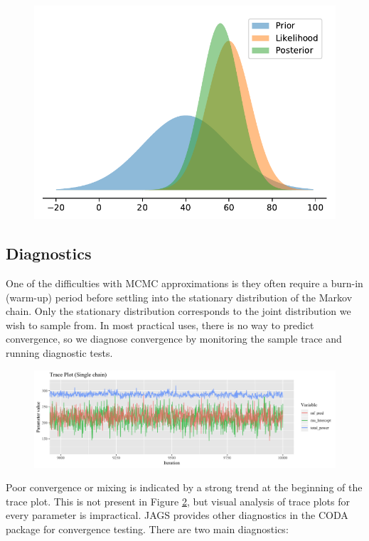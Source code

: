 \documentclass[a4paper, 12pt]{article}
\begin{document}
\begin{figure}
\centering
  \includegraphics[width=0.5\linewidth]{media/bayesdemo}
  \label{fig:bayesdemo}
\end{figure}

\subsection{Diagnostics}
One of the difficulties with MCMC approximations is they often require a burn-in (warm-up) period before settling into the stationary distribution of the Markov chain. Only the stationary distribution corresponds to the joint distribution we wish to sample from. In most practical uses, there is no way to predict convergence, so we diagnose convergence by monitoring the sample trace and running diagnostic tests.

\begin{figure}
\centering
  \includegraphics[width=\linewidth]{media/trace_plot}
  \label{fig:trace_plot}
\end{figure}

Poor convergence or mixing is indicated by a strong trend at the beginning of the trace plot. This is not present in Figure \ref{fig:trace_plot}, but visual analysis of trace plots for every parameter is impractical.
JAGS provides other diagnostics in the CODA package for convergence testing. There are two main diagnostics:
\end{document}
